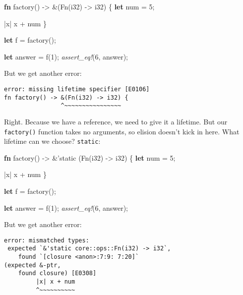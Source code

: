 \documentclass[a4paper,]{book}
\newenvironment{Shaded}{\begin{snugshade}}{\end{snugshade}}
\newcommand{\KeywordTok}[1]{\textcolor[rgb]{0.13,0.29,0.53}{\textbf{{#1}}}}
\newcommand{\DataTypeTok}[1]{\textcolor[rgb]{0.13,0.29,0.53}{{#1}}}
\newcommand{\DecValTok}[1]{\textcolor[rgb]{0.00,0.00,0.81}{{#1}}}
\newcommand{\OtherTok}[1]{\textcolor[rgb]{0.56,0.35,0.01}{{#1}}}
\newcommand{\BuiltInTok}[1]{{#1}}
\newcommand{\PreprocessorTok}[1]{\textcolor[rgb]{0.56,0.35,0.01}{\textit{{#1}}}}
\newcommand{\NormalTok}[1]{{#1}}
\begin{document}
\begin{Shaded}
\begin{Highlighting}[]
\KeywordTok{fn} \NormalTok{factory() -> &(}\BuiltInTok{Fn}\NormalTok{(}\DataTypeTok{i32}\NormalTok{) -> }\DataTypeTok{i32}\NormalTok{) \{}
    \KeywordTok{let} \NormalTok{num = }\DecValTok{5}\NormalTok{;}

    \NormalTok{|x| x + num}
\NormalTok{\}}

\KeywordTok{let} \NormalTok{f = factory();}

\KeywordTok{let} \NormalTok{answer = f(}\DecValTok{1}\NormalTok{);}
\PreprocessorTok{assert_eq!}\NormalTok{(}\DecValTok{6}\NormalTok{, answer);}
\end{Highlighting}
\end{Shaded}

But we get another error:

\begin{verbatim}
error: missing lifetime specifier [E0106]
fn factory() -> &(Fn(i32) -> i32) {
                ^~~~~~~~~~~~~~~~~
\end{verbatim}

Right. Because we have a reference, we need to give it a lifetime. But
our \texttt{factory()} function takes no arguments, so elision doesn't
kick in here. What lifetime can we choose?
\texttt{\textquotesingle{}static}:

\begin{Shaded}
\begin{Highlighting}[]
\KeywordTok{fn} \NormalTok{factory() -> &}\OtherTok{'static} \NormalTok{(}\BuiltInTok{Fn}\NormalTok{(}\DataTypeTok{i32}\NormalTok{) -> }\DataTypeTok{i32}\NormalTok{) \{}
    \KeywordTok{let} \NormalTok{num = }\DecValTok{5}\NormalTok{;}

    \NormalTok{|x| x + num}
\NormalTok{\}}

\KeywordTok{let} \NormalTok{f = factory();}

\KeywordTok{let} \NormalTok{answer = f(}\DecValTok{1}\NormalTok{);}
\PreprocessorTok{assert_eq!}\NormalTok{(}\DecValTok{6}\NormalTok{, answer);}
\end{Highlighting}
\end{Shaded}

But we get another error:

\begin{verbatim}
error: mismatched types:
 expected `&'static core::ops::Fn(i32) -> i32`,
    found `[closure <anon>:7:9: 7:20]`
(expected &-ptr,
    found closure) [E0308]
         |x| x + num
         ^~~~~~~~~~~
\end{verbatim}
\end{document}
